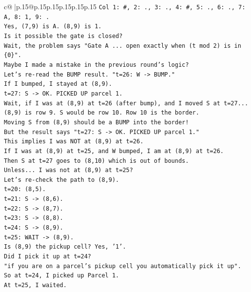 \documentclass{article}
\begin{document}
{\begin{supertabular}{c@{$\;$}|p{.15\linewidth}@{}p{.15\linewidth}p{.15\linewidth}p{.15\linewidth}p{.15\linewidth}p{.15\linewidth}}
{{{\texttt{Col 1: \#, 2: ., 3: ., 4: \#, 5: ., 6: ., 7: A, 8: 1, 9: .} \\
\texttt{Yes, (7,9) is A. (8,9) is 1.} \\
\texttt{Is it possible the gate is closed?} \\
\texttt{Wait, the problem says "Gate A ... open exactly when (t mod 2) is in \{0\}".} \\
\texttt{Maybe I made a mistake in the previous round's logic?} \\
\texttt{Let's re{-}read the BUMP result. "t=26: W {-}> BUMP."} \\
\texttt{If I bumped, I stayed at (8,9).} \\
\texttt{t=27: S {-}> OK. PICKED UP parcel 1.} \\
\texttt{Wait, if I was at (8,9) at t=26 (after bump), and I moved S at t=27...} \\
\texttt{(8,9) is row 9. S would be row 10. Row 10 is the border.} \\
\texttt{Moving S from (8,9) should be a BUMP into the border!} \\
\texttt{But the result says "t=27: S {-}> OK. PICKED UP parcel 1."} \\
\texttt{This implies I was NOT at (8,9) at t=26.} \\
\texttt{If I was at (8,9) at t=25, and W bumped, I am at (8,9) at t=26.} \\
\texttt{Then S at t=27 goes to (8,10) which is out of bounds.} \\
\texttt{Unless... I was not at (8,9) at t=25?} \\
\texttt{Let's re{-}check the path to (8,9).} \\
\texttt{t=20: (8,5).} \\
\texttt{t=21: S {-}> (8,6).} \\
\texttt{t=22: S {-}> (8,7).} \\
\texttt{t=23: S {-}> (8,8).} \\
\texttt{t=24: S {-}> (8,9).} \\
\texttt{t=25: WAIT {-}> (8,9).} \\
\texttt{Is (8,9) the pickup cell? Yes, '1'.} \\
\texttt{Did I pick it up at t=24?} \\
\texttt{"if you are on a parcel's pickup cell you automatically pick it up".} \\
\texttt{So at t=24, I picked up Parcel 1.} \\
\texttt{At t=25, I waited.} \\
}}}
\end{supertabular}}
\end{document}
